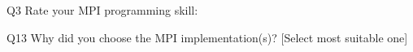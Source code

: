 \begin{description}%
\item{Q3} Rate your MPI programming skill:%
\item{Q13} Why did you choose the MPI implementation(s)? [Select most suitable one]%
\end{description}%
